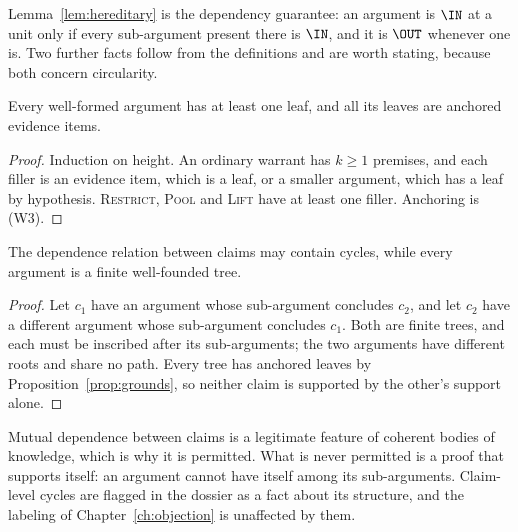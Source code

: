Lemma~\ref{lem:hereditary} is the dependency guarantee: an argument is $\IN$ at a unit only if every sub-argument present there is $\IN$, and it is $\OUT$ whenever one is. Two further facts follow from the definitions and are worth stating, because both concern circularity.

\begin{proposition}\label{prop:grounds}
Every well-formed argument has at least one leaf, and all its leaves are anchored evidence items.
\end{proposition}

\begin{proof}
Induction on height. An ordinary warrant has $k\ge1$ premises, and each filler is an evidence item, which is a leaf, or a smaller argument, which has a leaf by hypothesis. \textsc{Restrict}, \textsc{Pool} and \textsc{Lift} have at least one filler. Anchoring is (W3).
\end{proof}

\begin{proposition}\label{prop:nocircle}
The dependence relation between claims may contain cycles, while every argument is a finite well-founded tree.
\end{proposition}

\begin{proof}
Let $c_1$ have an argument whose sub-argument concludes $c_2$, and let $c_2$ have a different argument whose sub-argument concludes $c_1$. Both are finite trees, and each must be inscribed after its sub-arguments; the two arguments have different roots and share no path. Every tree has anchored leaves by Proposition~\ref{prop:grounds}, so neither claim is supported by the other's support alone.
\end{proof}

Mutual dependence between claims is a legitimate feature of coherent bodies of knowledge, which is why it is permitted. What is never permitted is a proof that supports itself: an argument cannot have itself among its sub-arguments. Claim-level cycles are flagged in the dossier as a fact about its structure, and the labeling of Chapter~\ref{ch:objection} is unaffected by them.
